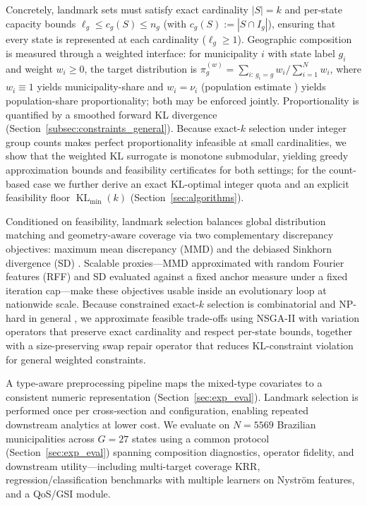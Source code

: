 \documentclass[10pt,journal]{IEEEtran}
\newcommand{\datasetN}{5569}              %
\newcommand{\1}{\mathbf{1}}
\DeclareMathOperator{\KL}{KL}
\theoremstyle{ieeethm}
\begin{document}
Concretely, landmark sets must satisfy exact cardinality $|S|=k$ and per-state capacity bounds
$\ell_g \le c_g(S)\le n_g$ (with $c_g(S):=|S\cap I_g|$), ensuring that every state is
represented at each cardinality ($\ell_g\ge 1$). Geographic composition is measured through a
weighted interface: for municipality $i$ with state label $g_i$ and weight $w_i\ge 0$, the
target distribution is
$\pi_g^{(w)}={\sum_{i:\,g_i=g} w_i}\big/{\sum_{i=1}^N w_i}$,
where $w_i\equiv 1$ yields municipality-share and $w_i=\nu_i$ (population
estimate \cite{ibgePopEst2025}) yields population-share proportionality; both may be enforced
jointly. Proportionality is quantified by a smoothed forward KL divergence
(Section~\ref{subsec:constraints_general}). Because exact-$k$ selection under integer group
counts makes perfect proportionality infeasible at small cardinalities, we show that the
weighted KL surrogate is monotone submodular, yielding greedy approximation bounds and
feasibility certificates for both settings; for the count-based case we further derive an exact
KL-optimal integer quota and an explicit feasibility floor $\KL_{\min}(k)$
(Section~\ref{sec:algorithms}).

Conditioned on feasibility, landmark selection balances global distribution matching and
geometry-aware coverage via two complementary discrepancy objectives: maximum mean discrepancy
(MMD) and the debiased Sinkhorn divergence (SD)
\cite{gretton2012kernel,villani2009ot,cuturi2013sinkhorn,feydy2019sinkhorn,peyre2019ot}.
Scalable proxies---MMD approximated with random Fourier features (RFF)
\cite{rahimi2007random} and SD evaluated against a fixed anchor measure under a fixed iteration
cap---make these objectives usable inside an evolutionary loop at nationwide scale. Because
constrained exact-$k$ selection is combinatorial and NP-hard in general
\cite{garey1979np,pardalos1991qp}, we approximate feasible trade-offs using NSGA-II
\cite{deb2002nsga2,deb2001moea,coello2007moea} with variation operators that preserve exact
cardinality and respect per-state bounds, together with a size-preserving swap repair operator
that reduces KL-constraint violation for general weighted constraints.

A type-aware preprocessing pipeline maps the mixed-type covariates to a consistent numeric
representation (Section~\ref{sec:exp_eval}).
Landmark selection is performed once per cross-section and configuration, enabling repeated
downstream analytics at lower cost.
We evaluate on $N=\datasetN$ Brazilian municipalities across $G=27$ states using a common
protocol (Section~\ref{sec:exp_eval}) spanning composition diagnostics, operator fidelity, and
downstream utility---including multi-target coverage KRR, regression/classification benchmarks
with multiple learners on Nystr\"{o}m features, and a QoS/GSI module.
\end{document}
